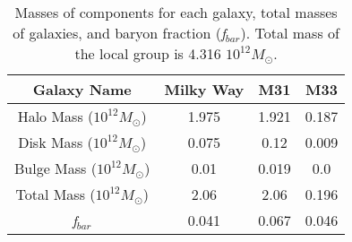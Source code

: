 \documentclass{article}
\begin{document}
\begin{table}
    \centering
    \begin{tabular}{|c|c|c|c|}
    \hline
         Galaxy Name & Milky Way & M31 & M33 \\ \hline
         Halo Mass ($10^{12} M_{\odot}$) & 1.975 & 1.921 & 0.187 \\ \hline
         Disk Mass ($10^{12} M_{\odot}$) & 0.075 & 0.12 & 0.009 \\ \hline
         Bulge Mass ($10^{12} M_{\odot}$) & 0.01 & 0.019 & 0.0 \\ \hline
         Total Mass ($10^{12} M_{\odot}$) & 2.06 & 2.06 & 0.196 \\ \hline
         \textit{f}$_{bar}$& 0.041 & 0.067 & 0.046 \\ \hline
    \end{tabular}
    \caption{Masses of components for each galaxy, total masses of galaxies, and baryon fraction (\textit{f}$_{bar}$). Total mass of the local group is 4.316 $10^{12} M_{\odot}$.}
    \label{tab:my_label}
\end{table}
\end{document}
